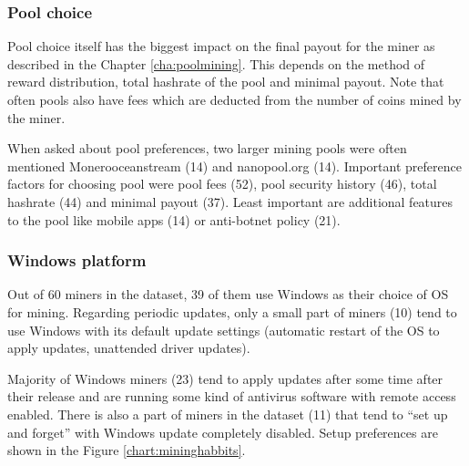 \documentclass[
  printed, %
  table,   %
  lof,     %
  lot,     %
           oneside, color
]{fithesis3}
\begin{document}
\subsubsection{Pool choice}
Pool choice itself has the biggest impact on the final payout for the miner as described in the Chapter \ref{cha:poolmining}. This depends on the method of reward distribution, total hashrate of the pool and minimal payout. Note that often pools also have fees which are deducted from the number of coins mined by the miner.

When asked about pool preferences, two larger mining pools were often mentioned Monerooceanstream (14) and nanopool.org (14). Important preference factors for choosing pool were pool fees (52), pool security history (46), total hashrate (44) and minimal payout (37). Least important are additional features to the pool like mobile apps (14) or anti-botnet policy (21).
\subsubsection{Windows platform}
Out of 60 miners in the dataset, 39 of them use Windows as their choice of OS for mining. Regarding periodic updates, only a small part of miners (10) tend to use Windows with its default update settings (automatic restart of the OS to apply updates, unattended driver updates). 

Majority of Windows miners (23) tend to apply updates after some time after their release and are running some kind of antivirus software with remote access enabled. There is also a part of miners in the dataset (11) that tend to \enquote{set up and forget} with Windows update completely disabled. Setup preferences are shown in the Figure \ref{chart:mininghabbits}.
\end{document}
